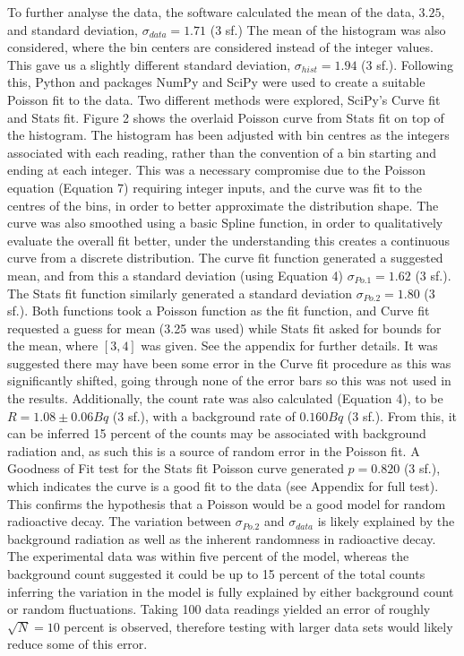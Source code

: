 \documentclass[11pt]{article}
\begin{document}
To further analyse the data, the software calculated the mean of the data, $3.25$, and standard deviation, $\sigma_{data} = 1.71 $ (3 sf.)
The mean of the histogram was also considered, where the bin centers are considered instead of the integer values. This gave us a slightly different standard deviation, $\sigma_{hist} = 1.94$ (3 sf.). 
Following this, Python and packages NumPy and SciPy were used to create a suitable Poisson fit to the data. Two different methods were explored, SciPy's Curve fit and Stats fit. 
Figure 2 shows the overlaid Poisson curve from Stats fit on top of the histogram. The histogram has been adjusted with bin centres as the integers associated with each reading, rather than the convention of a bin starting and ending at each integer. This was a necessary compromise due to the Poisson equation (Equation 7) requiring integer inputs, and the curve was fit to the centres of the bins, in order to better approximate the distribution shape. The curve was also smoothed using a basic Spline function, in order to qualitatively evaluate the overall fit better, under the understanding this creates a continuous curve from a discrete distribution.
The curve fit function generated a suggested mean, and from this a standard deviation (using Equation 4) $\sigma_{Po.1} = 1.62$ (3 sf.). The Stats fit function similarly generated a standard deviation $\sigma_{Po.2} = 1.80 $ (3 sf.). Both functions took a Poisson function as the fit function, and Curve fit requested a guess for mean (3.25 was used) while Stats fit asked for bounds for the mean, where $[3,4]$ was given. See the appendix for further details. It was suggested there may have been some error in the Curve fit procedure as this was significantly shifted, going through none of the error bars so this was not used in the results. 
Additionally, the count rate was also calculated (Equation 4), to be $R = 1.08 \pm 0.06  Bq$ (3 sf.), with a background rate of $0.160 Bq$ (3 sf.). From this, it can be inferred 15 percent of the counts may be associated with background radiation and, as such this is a source of random error in the Poisson fit.
A Goodness of Fit test for the Stats fit Poisson curve generated $p = 0.820$ (3 sf.), which indicates the curve is a good fit to the data (see Appendix for full test). This confirms the hypothesis that a Poisson would be a good model for random radioactive decay. 
The variation between $\sigma_{Po.2}$ and $\sigma_{data}$ is likely explained by the background radiation as well as the inherent randomness in radioactive decay. The experimental data was within five percent of the model, whereas the background count suggested it could be up to 15 percent of the total counts inferring the variation in the model is fully explained by either background count or random fluctuations. Taking 100 data readings yielded an error of roughly $\sqrt{N} = 10$ percent is observed, therefore testing with larger data sets would likely reduce some of this error.  
\end{document}
